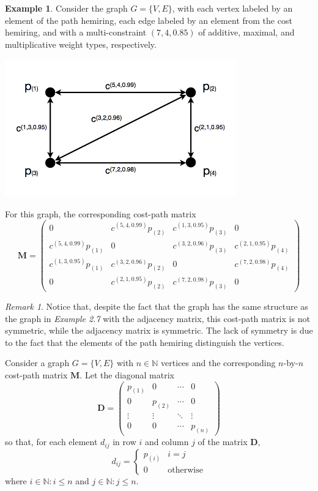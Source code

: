 \documentclass[12pt]{amsart}
\theoremstyle{definition}
\newtheorem{example}[thm]{Example}
\theoremstyle{remark}
\newtheorem{remark}[thm]{Remark}
\numberwithin{equation}{section}
\newcommand{\N}{\mathbb{N}}
\begin{document}
\begin{example}
Consider the graph $G = \{V, E\}$, with each vertex labeled by an element of the path hemiring, each edge labeled by an element from the cost hemiring, and with a multi-constraint $(7, 4, 0.85)$ of additive, maximal, and multiplicative weight types, respectively.

\begin{center}\includegraphics[width=10cm]{figure-8-plus.png}\end{center}

\noindent For this graph, the corresponding cost-path matrix
$$
\mathbf{M} = 
\left( \begin{array}{cccc}
0 & c^{(5,4,0.99)} p_{(2)} & c^{(1,3,0.95)} p_{(3)} & 0 \\
c^{(5,4,0.99)} p_{(1)} & 0 & c^{(3,2,0.96)} p_{(3)} & c^{(2,1,0.95)} p_{(4)} \\
c^{(1,3,0.95)} p_{(1)} & c^{(3,2,0.96)} p_{(2)} & 0 & c^{(7,2,0.98)} p_{(4)} \\
0 & c^{(2,1,0.95)} p_{(2)} & c^{(7,2,0.98)} p_{(3)} & 0 \end{array} \right)
$$
\end{example}

\begin{remark}
Notice that, despite the fact that the graph has the same structure as the graph in \textit{Example 2.7} with the adjacency matrix, this cost-path matrix is not symmetric, while the adjacency matrix is symmetric. The lack of symmetry is due to the fact that the elements of the path hemiring distinguish the vertices.
\end{remark}

Consider a graph $G = \{V,E\}$ with $n \in \N$ vertices and the corresponding $n$-by-$n$ cost-path matrix $\mathbf{M}$. Let the diagonal matrix
$$
\mathbf{D} =
\left( \begin{array}{cccc}
p_{(1)} & 0 & \cdots & 0 \\
0 & p_{(2)} & \cdots & 0 \\
\vdots & \vdots & \ddots & \vdots \\
0 & 0 & \cdots & p_{(n)} \end{array} \right)
$$
so that, for each element $d_{ij}$ in row $i$ and column $j$ of the matrix $\mathbf{D}$,
$$
	d_{ij} = \left\{
		\begin{array}{ll}
			p_{(i)} & i = j \\
			0          & \text{otherwise}
		\end{array}
	\right.
$$
where $i \in \N : i \le n$ and $j \in \N : j \le n$.
\end{document}
